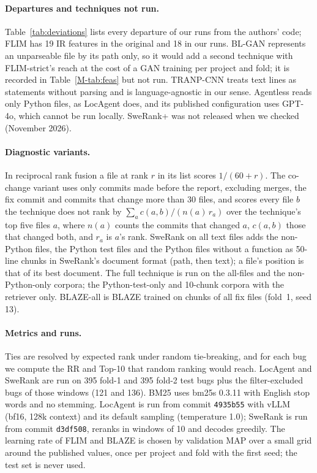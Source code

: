 \documentclass[10pt,a4paper]{article}
\begin{document}
\paragraph{Departures and techniques not run.} Table~\ref{tab:deviations} lists
every departure of our runs from the authors' code; FLIM has 19 IR features in
the original and 18 in our runs. BL-GAN \citep{zhu2022bl} represents an
unparseable file by its path only, so it would add a second technique with
FLIM-strict's reach at the cost of a GAN training per project and fold; it is
recorded in Table~\ref{M-tab:feas} but not run. TRANP-CNN \citep{huo2019deep}
treats text lines as statements without parsing and is language-agnostic in our
sense. Agentless \citep{xia2024agentless} reads only Python files, as LocAgent
does, and its published configuration uses GPT-4o, which cannot be run locally.
SweRank+ \citep{reddy2025sweranplus} was not released when we checked
(November 2026).



\paragraph{Diagnostic variants.} In reciprocal rank fusion a file at rank $r$
in its list scores $1/(60+r)$. The co-change variant uses only commits made
before the report, excluding merges, the fix commit and commits that change more
than 30 files, and scores every file $b$ the technique does not rank by
$\sum_{a} c(a,b)/(n(a)\,r_a)$ over the technique's top five files $a$, where
$n(a)$ counts the commits that changed $a$, $c(a,b)$ those that changed both,
and $r_a$ is $a$'s rank. SweRank on all text files adds the non-Python files,
the Python test files and the Python files without a function as 50-line chunks
in SweRank's document format (path, then text); a file's position is that of
its best document. The full technique is run on the all-files and the
non-Python-only corpora; the Python-test-only and 10-chunk corpora with the
retriever only. BLAZE-all is BLAZE trained on chunks of all fix files (fold~1,
seed 13).

\paragraph{Metrics and runs.} Ties are resolved by expected rank under random
tie-breaking, and for each bug we compute the RR and Top-10 that random ranking
would reach. LocAgent and SweRank are
run on 395 fold-1 and 395 fold-2 test bugs plus the filter-excluded bugs of
those windows (121 and 136). BM25 uses bm25s 0.3.11 with English stop words and no stemming.
LocAgent is run from commit \texttt{4935b55} with vLLM (bf16, 128k context) and
its default sampling (temperature 1.0); SweRank is run from commit
\texttt{d3df508}, reranks in windows of 10 and decodes greedily. The learning rate of FLIM and BLAZE is chosen by validation
MAP over a small grid around the published values, once per project and fold
with the first seed; the test set is never used.
\end{document}
